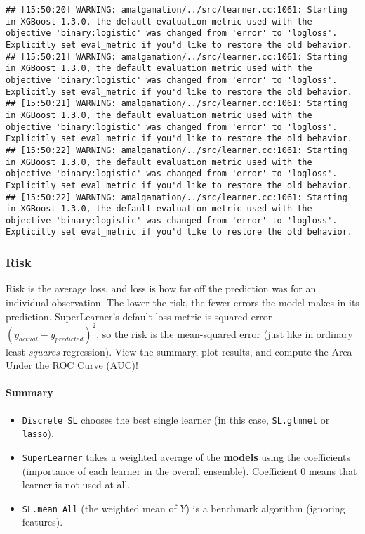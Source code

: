\documentclass[
]{book}
\providecommand{\tightlist}{%
  \setlength{\itemsep}{0pt}\setlength{\parskip}{0pt}}
\begin{document}
\begin{verbatim}
## [15:50:20] WARNING: amalgamation/../src/learner.cc:1061: Starting in XGBoost 1.3.0, the default evaluation metric used with the objective 'binary:logistic' was changed from 'error' to 'logloss'. Explicitly set eval_metric if you'd like to restore the old behavior.
## [15:50:21] WARNING: amalgamation/../src/learner.cc:1061: Starting in XGBoost 1.3.0, the default evaluation metric used with the objective 'binary:logistic' was changed from 'error' to 'logloss'. Explicitly set eval_metric if you'd like to restore the old behavior.
## [15:50:21] WARNING: amalgamation/../src/learner.cc:1061: Starting in XGBoost 1.3.0, the default evaluation metric used with the objective 'binary:logistic' was changed from 'error' to 'logloss'. Explicitly set eval_metric if you'd like to restore the old behavior.
## [15:50:22] WARNING: amalgamation/../src/learner.cc:1061: Starting in XGBoost 1.3.0, the default evaluation metric used with the objective 'binary:logistic' was changed from 'error' to 'logloss'. Explicitly set eval_metric if you'd like to restore the old behavior.
## [15:50:22] WARNING: amalgamation/../src/learner.cc:1061: Starting in XGBoost 1.3.0, the default evaluation metric used with the objective 'binary:logistic' was changed from 'error' to 'logloss'. Explicitly set eval_metric if you'd like to restore the old behavior.
\end{verbatim}

\hypertarget{risk}{%
\subsubsection{Risk}\label{risk}}

Risk is the average loss, and loss is how far off the prediction was for an individual observation. The lower the risk, the fewer errors the model makes in its prediction. SuperLearner's default loss metric is squared error \((y_{actual} - y_{predicted})^2\), so the risk is the mean-squared error (just like in ordinary least \emph{squares} regression). View the summary, plot results, and compute the Area Under the ROC Curve (AUC)!

\hypertarget{summary}{%
\paragraph{Summary}\label{summary}}

\begin{itemize}
\tightlist
\item
  \texttt{Discrete\ SL} chooses the best single learner (in this case, \texttt{SL.glmnet} or \texttt{lasso}).
\item
  \texttt{SuperLearner} takes a weighted average of the \textbf{models} using the coefficients (importance of each learner in the overall ensemble). Coefficient 0 means that learner is not used at all.
\item
  \texttt{SL.mean\_All} (the weighted mean of \(Y\)) is a benchmark algorithm (ignoring features).
\end{itemize}
\end{document}
